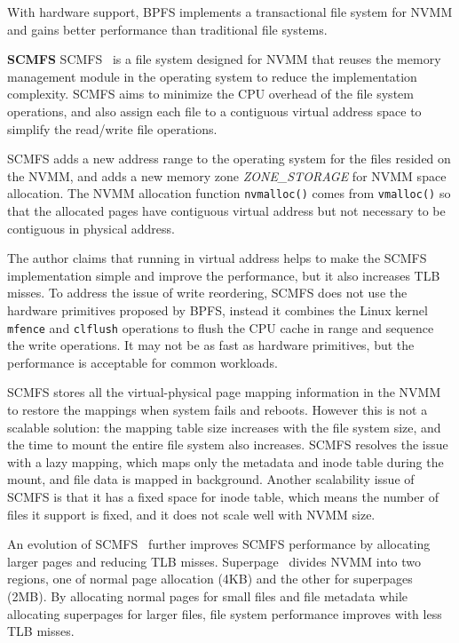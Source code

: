 With hardware support, BPFS implements a transactional file system for NVMM
and gains better performance than traditional file systems.

\textbf{SCMFS} SCMFS~\cite{scmfs} is a file system designed for NVMM that
reuses the memory
management module in the operating system to reduce the implementation
complexity. SCMFS aims to minimize the CPU overhead of the file system
operations, and also assign each file to a contiguous virtual address space
to simplify the read/write file operations.

SCMFS adds a new address range to the operating system for the files resided
on the NVMM, and 
adds a new memory zone \emph{ZONE\_STORAGE} for NVMM space allocation. The
NVMM allocation function \texttt{nvmalloc()} comes from \texttt{vmalloc()}
so that the allocated pages have contiguous virtual address but not necessary
to be contiguous in physical address.

The author claims that running in virtual address helps to make the SCMFS
implementation simple and improve the performance, but it also increases
TLB misses. To address the issue of write reordering, SCMFS does not use the
hardware primitives proposed by BPFS, instead it combines the Linux kernel
\texttt{mfence} and \texttt{clflush} operations to flush the CPU cache in
range and sequence the write operations. It may not be as fast as hardware
primitives, but the performance is acceptable for common workloads.

SCMFS stores all the virtual-physical page mapping information in the NVMM
to restore the mappings when system fails and reboots. However this is not
a scalable solution: the mapping table size increases with the file system
size, and the time to mount the entire file system also increases. SCMFS
resolves the issue with a lazy mapping, which maps only the metadata and inode
table during the mount, and file data is mapped in background.
Another scalability issue of SCMFS is that it has a fixed space for inode table,
which means the number of files it support is fixed, and it does not scale
well with NVMM size.

An evolution of SCMFS~\cite{superpage} further improves SCMFS performance
by allocating larger pages and reducing TLB misses. Superpage~\cite{superpage}
divides NVMM into two regions, one of normal page allocation (4KB) and the other
for superpages (2MB). By allocating normal pages for small files and file 
metadata while allocating superpages for larger files, file system performance
improves with less TLB misses.


